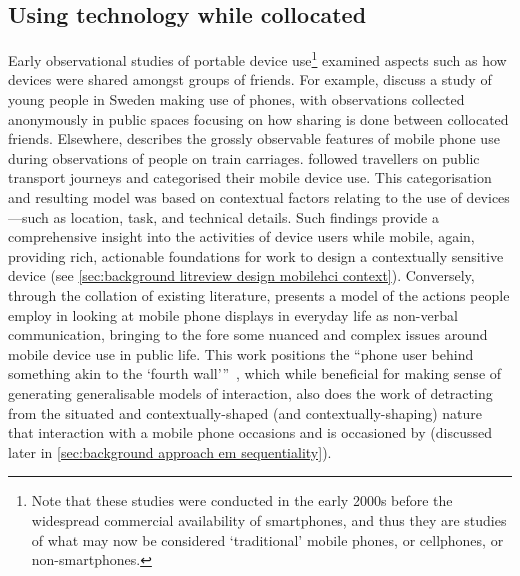 \subsection{Using technology while collocated}\label{sec:background litreview f2f tech-while-collocated}
Early observational studies of portable device use\footnote{Note that these studies were conducted in the early 2000s before the widespread commercial availability of smartphones, and thus they are studies of what may now be considered `traditional' mobile phones, or cellphones, or non-smartphones.} examined aspects such as how devices were shared amongst groups of friends.
For example, \citet{Weilenmann2002} discuss a study of young people in Sweden making use of phones, with observations collected anonymously in public spaces focusing on how sharing is done between collocated friends.
Elsewhere, \citet{Murtagh2002} describes the grossly observable features of mobile phone use during observations of people on train carriages. %
\citet{Krehl2013} followed travellers on public transport journeys and categorised their mobile device use.
This categorisation and resulting model was based on contextual factors relating to the use of devices---such as location, task, and technical details.
Such findings provide a comprehensive insight into the activities of device users while mobile, again, providing rich, actionable foundations for work to design a contextually sensitive device (see \ref{sec:background litreview design mobilehci context}).
Conversely, through the collation of existing literature, \citet{Nakamura2015} presents a model of the actions people employ in looking at mobile phone displays in everyday life as non-verbal communication, bringing to the fore some nuanced and complex issues around mobile device use in public life.
This work positions the ``phone user behind something akin to the `fourth wall'''~\citep[p. 74]{Nakamura2015}, which while beneficial for making sense of generating generalisable models of interaction, also does the work of detracting from the situated and contextually-shaped (and contextually-shaping) nature that interaction with a mobile phone occasions and is occasioned by (discussed later in \ref{sec:background approach em sequentiality}). 


